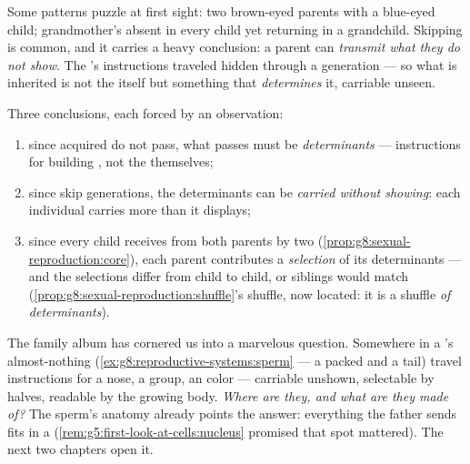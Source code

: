 \begin{example}\label{ex:g9:heredity-and-traits:skip}
Some patterns puzzle at first sight: two brown-eyed
parents with a blue-eyed child; grandmother's 
absent in every child yet returning in a grandchild.
Skipping is common, and it carries a heavy conclusion: a
parent can \emph{transmit what they do not show}. The
's instructions traveled hidden through a generation
--- so what is inherited is not the  itself but
something that \emph{determines} it, carriable unseen.
\end{example}

\begin{proposition}\label{prop:g9:heredity-and-traits:conclusions}
Three conclusions, each forced by an observation:
\begin{enumerate}
  \item since acquired  do not pass, what passes
        must be \emph{determinants} --- instructions for
        building , not the  themselves;
  \item since  skip generations, the determinants
        can be \emph{carried without showing}: each
        individual carries more than it displays;
  \item since every child receives from both parents by
        two 
        (\cref{prop:g8:sexual-reproduction:core}), each
        parent contributes a \emph{selection} of its
        determinants --- and the selections differ from
        child to child, or siblings would match
        (\cref{prop:g8:sexual-reproduction:shuffle}'s
        shuffle, now located: it is a shuffle \emph{of
        determinants}).
\end{enumerate}
\end{proposition}
\admitted

\begin{remark}\label{rem:g9:heredity-and-traits:question}
The family album has cornered us into a marvelous
question. Somewhere in a 's almost-nothing
(\cref{ex:g8:reproductive-systems:sperm} --- a packed
 and a tail) travel instructions for a nose, a
 group, an  color --- carriable unshown,
selectable by halves, readable by the growing body.
\emph{Where are they, and what are they made of?} The
sperm's anatomy already points the answer: everything the
father sends fits in a 
(\cref{rem:g5:first-look-at-cells:nucleus} promised that
spot mattered). The next two chapters open it.
\end{remark}

